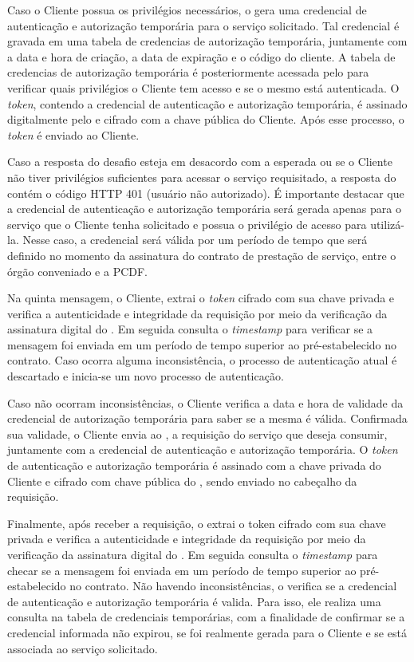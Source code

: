 Caso o Cliente possua os privil\'{e}gios necess\'{a}rios, o \servidorAA{} gera uma credencial de autenticação e autorização temporária para o serviço solicitado. Tal 
credencial é gravada em uma tabela de credencias de autorização temporária, juntamente com a data e hora de criação, a 
data de expiração e o código do cliente. A tabela de credencias de autorização temporária \'{e} posteriormente acessada pelo \servidorRest{}  
para verificar quais privilégios o Cliente tem acesso e se o mesmo está autenticada. O \emph{token}, contendo a credencial de 
autenticação e autorização temporária, é  assinado digitalmente pelo \servidorAA{} e cifrado  com a chave pública do Cliente. 
Após esse processo, o \emph{token} é enviado ao Cliente.

Caso a resposta do desafio esteja em desacordo com a esperada ou se o Cliente não tiver privilégios 
suficientes para acessar o serviço requisitado, a resposta do \servidorAA{} cont\'{e}m o c\'{o}digo HTTP 401 (usuário não autorizado).
É importante destacar que a credencial de autenticação e autorização temporária será gerada apenas para o serviço que o Cliente tenha 
solicitado e possua o privilégio de acesso para utilizá-la. Nesse caso, a credencial 
será válida por um período  de tempo que será definido no momento da assinatura do contrato de prestação de serviço, 
entre o órgão conveniado e a PCDF.

Na quinta mensagem, o Cliente, extrai o \emph{token} cifrado com sua chave privada e verifica a autenticidade e integridade 
da requisição por meio da verificação da assinatura digital do \servidorAA. Em seguida consulta  
o \emph{timestamp} para verificar se a mensagem foi enviada em um período de tempo superior ao pré-estabelecido no contrato. 
Caso ocorra alguma inconsist\^{e}ncia, o processo de autenticação atual é descartado e inicia-se um novo processo de autenticação.

Caso não ocorram inconsist\^{e}ncias, o Cliente verifica a data e hora de validade da credencial de autorização temporária para saber se a 
mesma é válida. Confirmada sua validade, o Cliente envia ao \servidorRest, a requisição do serviço que deseja consumir, 
juntamente com a credencial de autenticação e autorização temporária. O \emph{token} de autenticação e autorização 
temporária é assinado com a chave privada do Cliente e cifrado com chave pública do \servidorRest, 
sendo enviado no cabeçalho da requisição.

Finalmente, após receber a requisição, o \servidorRest{} extrai o token cifrado com sua chave privada e verifica a autenticidade 
e integridade da requisição por meio da verificação da assinatura digital do \servidorAA. 
Em seguida consulta o \emph{timestamp} para checar se a mensagem foi enviada em um período de 
tempo superior ao pré-estabelecido no contrato. Não havendo inconsist\^{e}ncias, o \servidorRest{} 
verifica se a credencial de autenticação e autorização temporária é valida. Para isso, ele realiza uma consulta na tabela de 
credenciais temporárias, com a finalidade de confirmar se a credencial informada não expirou, 
se  foi realmente gerada para o Cliente e se 
está associada ao serviço solicitado.

